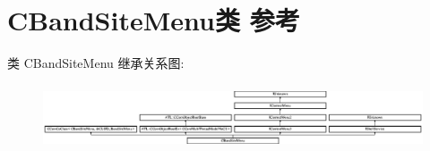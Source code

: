 \hypertarget{class_c_band_site_menu}{}\section{C\+Band\+Site\+Menu类 参考}
\label{class_c_band_site_menu}
类 C\+Band\+Site\+Menu 继承关系图\+:\begin{figure}[H]
\begin{center}
\leavevmode
\includegraphics[height=1.949861cm]{class_c_band_site_menu}
\end{center}
\end{figure}
